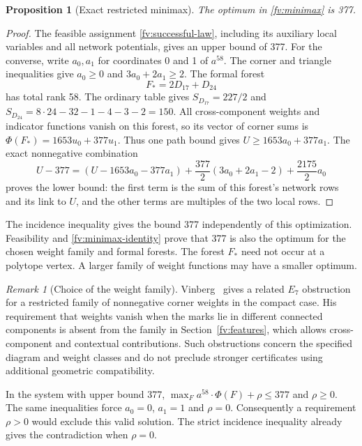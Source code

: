 \documentclass[11pt]{article}
\newtheorem{proposition}[theorem]{Proposition}
\theoremstyle{definition}
\theoremstyle{remark}
\newtheorem{remark}[theorem]{Remark}
\numberwithin{equation}{section}
\begin{document}
\begin{proposition}[Exact restricted minimax]\label{fv:exact-minimax}
The optimum in \eqref{fv:minimax} is 377.
\end{proposition}

\begin{proof}
The feasible assignment \eqref{fv:successful-law}, including
its auxiliary local variables and all network potentials, gives an upper
bound of 377. For the converse, write $a_0,a_1$ for coordinates 0 and
1 of $a^{58}$. The corner and triangle inequalities give
$a_0\ge0$ and $3a_0+2a_1\ge2$.
The formal forest
\[
                    F_*=2D_{17}+D_{24}
\]
has total rank 58. The ordinary table gives
$S_{D_{17}}=227/2$ and
$S_{D_{24}}=8\cdot24-32-1-4-3-2=150$. All cross-component weights and indicator functions vanish on this
forest, so its vector of corner sums is
$\Phi(F_*)=1653u_0+377u_1$. Thus one path bound gives
$U\ge1653a_0+377a_1$. The exact nonnegative combination
\begin{equation}\label{fv:minimax-identity}
 U-377=(U-1653a_0-377a_1)
 +\frac{377}{2}(3a_0+2a_1-2)+\frac{2175}{2}a_0
\end{equation}
proves the lower bound: the first term is the sum of this forest's
network rows and its link to $U$, and the other terms are multiples
of the two local rows.
\end{proof}

The incidence inequality gives the bound 377 independently of this
optimization. Feasibility and \eqref{fv:minimax-identity} prove that
377 is also the optimum for the chosen weight family and formal
forests. The forest $F_*$ need not occur at a polytope vertex. A larger
family of weight functions may have a smaller optimum.

\begin{remark}[Choice of the weight family]\label{fv:vinberg-weight-obstruction}
Vinberg~\cite[\S6.12, p.~91]{Vinberg1984} gives a related $E_7$
obstruction for a restricted family of nonnegative corner weights in
the compact case. His requirement that weights vanish when the marks
lie in different connected components is absent from the family in
Section~\ref{fv:features}, which allows cross-component and contextual
contributions. Such obstructions concern the specified diagram and
weight classes and do not preclude stronger certificates using
additional geometric compatibility.
\end{remark}

In the system with upper bound 377,
$\max_Fa^{58}\cdot\Phi(F)+\rho\le377$ and $\rho\ge0$.
The same inequalities force $a_0=0$, $a_1=1$ and $\rho=0$.
Consequently a requirement $\rho>0$ would exclude this valid
solution. The strict incidence inequality already gives the
contradiction when $\rho=0$.
\end{document}

